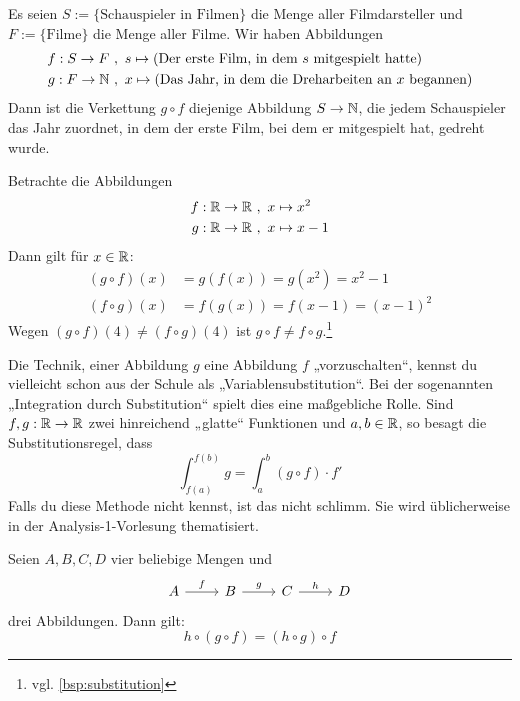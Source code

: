 \begin{bsp}
    Es seien $S:= \{ \text{Schauspieler in Filmen}\}$ die Menge aller Filmdarsteller und $F:=\{\text{Filme}\}$ die Menge aller Filme. Wir haben Abbildungen
    \begin{align*}
        f : S \to F \ & ,\ s\mapsto (\text{Der erste Film, in dem $s$ mitgespielt hatte}) \\
        g : F \to \mathbb N \ & ,\ x \mapsto (\text{Das Jahr, in dem die Dreharbeiten an $x$ begannen})
    \end{align*}
    Dann ist die Verkettung $g\circ f$ diejenige Abbildung $S\to \mathbb N$, die jedem Schauspieler das Jahr zuordnet, in dem der erste Film, bei dem er mitgespielt hat, gedreht wurde.
\end{bsp}


\begin{bsp} \label{bsp:verkettung}
    Betrachte die Abbildungen
    \begin{align*}
        f : \mathbb R \to \mathbb R \ &,\ x\mapsto x^2 \\
        g : \mathbb R \to \mathbb R \ &,\ x \mapsto x-1
    \end{align*}
    Dann gilt für $x\in \mathbb R$:
    \begin{align*}
        (g\circ f)(x) & = g(f(x)) = g(x^2) = x^2-1 \\
        (f\circ g)(x) & = f(g(x)) = f(x-1) = (x-1)^2
    \end{align*}
    Wegen $(g\circ f)(4)\neq (f\circ g)(4)$ ist $g\circ f\neq f\circ g$.\footnote{vgl. \cref{bsp:substitution}}
\end{bsp}


\begin{vorschau}
    Die Technik, einer Abbildung $g$ eine Abbildung $f$ „vorzuschalten“, kennst du vielleicht schon aus der Schule als „Variablensubstitution“. Bei der sogenannten „Integration durch Substitution“ spielt dies eine maßgebliche Rolle. Sind $f,g:\mathbb R\to \mathbb R$ zwei hinreichend „glatte“ Funktionen und $a,b\in \mathbb R$, so besagt die Substitutionsregel, dass
        \[ \int_{f(a)}^{f(b)} g = \int_a^b (g\circ f) \cdot f' \]
    Falls du diese Methode nicht kennst, ist das nicht schlimm. Sie wird üblicherweise in der Analysis-1-Vorlesung thematisiert.
\end{vorschau}


\begin{satz} \label{abbassoziativ}
    Seien $A,B,C,D$ vier beliebige Mengen und
    \[\begin{tikzcd}
        A \ar[r, "f"] & B \ar[r, "g"] & C \ar[r, "h"] & D
    \end{tikzcd}\]
    drei Abbildungen. Dann gilt:
        \[ h\circ (g\circ f) = (h\circ g)\circ f\]
\end{satz}



